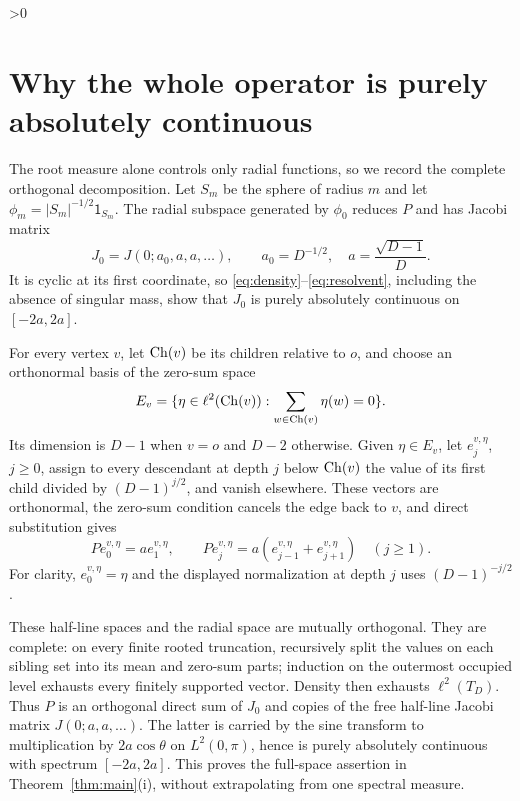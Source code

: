 \documentclass[10pt]{article}
\providecommand{\CRevisionRound}{2}
\theoremstyle{remark}
\newcommand{\1}{\mathsf{1}}
\begin{document}
\ifnum\CRevisionRound>0
\section{Why the whole operator is purely absolutely continuous}

The root measure alone controls only radial functions, so we record the
complete orthogonal decomposition.  Let $S_m$ be the sphere of radius $m$
and let $\phi_m=|S_m|^{-1/2}\1_{S_m}$.  The radial subspace generated by
$\phi_0$ reduces $P$ and has Jacobi matrix
\begin{equation}
 J_0=J(0;a_0,a,a,\ldots),\qquad
 a_0=D^{-1/2},\quad a=\frac{\sqrt{D-1}}D.                 \label{eq:radialjacobi}
\end{equation}
It is cyclic at its first coordinate, so
\eqref{eq:density}--\eqref{eq:resolvent}, including the absence of
singular mass, show that $J_0$ is purely absolutely continuous on
$[-2a,2a]$.

For every vertex $v$, let ${\rm Ch}(v)$ be its children relative to $o$,
and choose an orthonormal basis of the zero-sum space
\[
 E_v=\{\eta\in\ell^2({\rm Ch}(v)):\sum_{w\in{\rm Ch}(v)}\eta(w)=0\}.
\]
Its dimension is $D-1$ when $v=o$ and $D-2$ otherwise.  Given
$\eta\in E_v$, let $e_j^{v,\eta}$, $j\ge0$, assign to every descendant
at depth $j$ below ${\rm Ch}(v)$ the value of its first child divided by
$(D-1)^{j/2}$, and vanish elsewhere.  These vectors are orthonormal, the
zero-sum condition cancels the edge back to $v$, and direct substitution gives
\begin{equation}
 Pe_0^{v,\eta}=ae_1^{v,\eta},\qquad
 Pe_j^{v,\eta}=a(e_{j-1}^{v,\eta}+e_{j+1}^{v,\eta})\quad(j\ge1).
                                                               \label{eq:freejacobi}
\end{equation}
For clarity, $e_0^{v,\eta}=\eta$ and the displayed normalization at depth
$j$ uses $(D-1)^{-j/2}$.

These half-line spaces and the radial space are mutually orthogonal.
They are complete: on every finite rooted truncation, recursively split the
values on each sibling set into its mean and zero-sum parts; induction on the
outermost occupied level exhausts every finitely supported vector.  Density
then exhausts $\ell^2(T_D)$.  Thus $P$ is an orthogonal direct sum of $J_0$
and copies of the free half-line Jacobi matrix $J(0;a,a,\ldots)$.  The latter
is carried by the sine transform to multiplication by $2a\cos\theta$ on
$L^2(0,\pi)$, hence is purely absolutely continuous with spectrum
$[-2a,2a]$.  This proves the full-space assertion in Theorem~\ref{thm:main}(i),
without extrapolating from one spectral measure.
\end{document}
